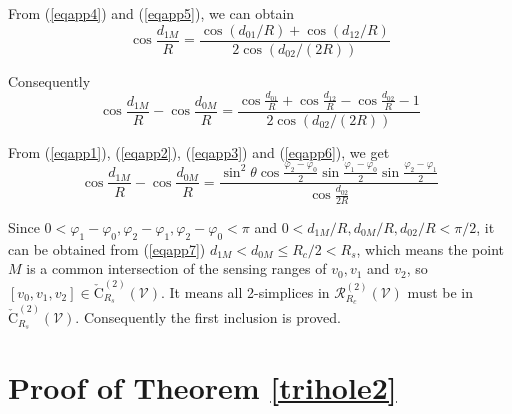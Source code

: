 \documentclass[journal, twoside]{IEEEtran}
\begin{document}
\begin{IEEEproof}
From (\ref{eqapp4}) and (\ref{eqapp5}), we can obtain 
\begin{equation}
 \cos \frac{d_{1M}}{R} = \frac{\cos (d_{01}/R) + \cos (d_{12}/R)}{2\cos (d_{02}/(2R))}
\end{equation}

Consequently 
\begin{equation} \label{eqapp6}
   \cos \frac{d_{1M}}{R} - \cos \frac{d_{0M}}{R} = \frac{\cos \frac{d_{01}}{R} + \cos \frac{d_{12}}{R} - \cos \frac{d_{02}}{R} - 1}{2\cos (d_{02}/(2R))} 
\end{equation}

From (\ref{eqapp1}), (\ref{eqapp2}), (\ref{eqapp3}) and (\ref{eqapp6}), we get
\begin{equation} \label{eqapp7}
 \cos \frac{d_{1M}}{R} - \cos \frac{d_{0M}}{R} = \frac{\sin^2 \theta \cos \frac{\varphi_2 - \varphi_0}{2} 
                                          \sin \frac{\varphi_1 - \varphi_0}{2} \sin \frac{\varphi_2 - \varphi_1}{2}}{\cos \frac{d_{02}}{2R}}
\end{equation}

Since $0< \varphi_1 - \varphi_0, \varphi_2 - \varphi_1, \varphi_2 - \varphi_0 < \pi$
and $0 < d_{1M}/R, d_{0M}/R , d_{02}/R < \pi/2$, it can be obtained from (\ref{eqapp7}) 
$d_{1M} < d_{0M} \leq R_c/2 < R_s$, which means the point $M$ is a common
intersection of the sensing ranges of $v_0, v_1$ and $v_2$, so 
$[v_0, v_1, v_2] \in \check{\textrm{C}}_{R_s}^{(2)}(\mathcal{V})$.
It means all 2-simplices in $\mathcal{R}_{R_c}^{(2)}(\mathcal{V})$ must be in $\check{\textrm{C}}_{R_s}^{(2)}(\mathcal{V})$.
Consequently the first inclusion is proved.

\end{IEEEproof}

\section{Proof of Theorem \ref{trihole2}} \label{app2}
\end{document}
